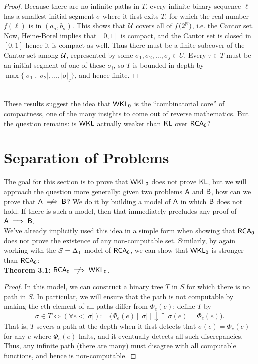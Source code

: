 \documentclass{amsart}
\begin{document}
\begin{proof}
		Because there are no infinite paths in $T$, every infinite binary sequence $\ell$ has a smallest initial segment $\sigma$ where it first exits $T$, for which the real number $f(\ell)$ is in $(a_{\sigma},b_{\sigma})$. This shows that $\mathcal{U}$ covers all of $f(2^{\mathbb{N}})$, i.e. the Cantor set.\\
		
		Now, Heine-Borel implies that $[0,1]$ is compact, and the Cantor set is closed in $[0,1]$ hence it is compact as well. Thus there must be a finite subcover of the Cantor set among $\mathcal{U}$, represented by some $\sigma_1,\sigma_2,\dots,\sigma_j\in U$. Every $\tau\in T$ must be an initial segment of one of these $\sigma_i$, so $T$ is bounded in depth by $\max\{|\sigma_1|,|\sigma_2|,\dots,|\sigma|_j\}$, and hence finite.
	\end{proof}\\
	
	These results suggest the idea that $\operatorname{\sf{WKL_0}}$ is the ``combinatorial core'' of compactness, one of the many insights to come out of reverse mathematics. But the question remains: is $\sf{WKL}$ actually weaker than $\operatorname{\sf{KL}}$ over $\operatorname{\sf{RCA_0}}$? 
	
	\newpage
	
	
	
	
	\section{Separation of Problems}
	
	The goal for this section is to prove that $\operatorname{\sf{WKL_0}}$ does not prove $\operatorname{\sf{KL}}$, but we will approach the question more generally: given two problems $\sf{A}$ and $\sf{B}$, how can we prove that $\sf{A}\centernot\implies \sf{B}$? We do it by building a model of $\sf{A}$ in which $\sf{B}$ does not hold. If there is such a model, then that immediately precludes any proof of $\sf{A}\implies \sf{B}$.\\
	
	We've already implicitly used this idea in a simple form when showing that $\operatorname{\sf{RCA_0}}$ does not prove the existence of any non-computable set. Similarly, by again working with the $\mathcal{S}=\Delta_1$ model of $\operatorname{\sf{RCA_0}}$, we can show that $\operatorname{\sf{WKL_0}}$ is stronger than $\operatorname{\sf{RCA_0}}$:\\
	
	\noindent \textbf{Theorem 3.1:} $\RCA\centernot\implies \WKL$.
	\begin{proof}
		In this model, we can construct a binary tree $T$ in $S$ for which there is no path in $S$. In particular, we will ensure that the path is not computable by making the $e$th element of all paths differ from $\Phi_e(e)$: define $T$ by 
		$$
		\sigma \in T \iff (\forall e < |\sigma|):\; \neg\big(\Phi_e(e)[|\sigma|]\downarrow \, \^ \;\, \sigma(e) = \Phi_e(e)\big).
		$$
		That is, $T$ severs a path at the depth when it first detects that $\sigma(e)=\Phi_e(e)$ for any $e$ where $\Phi_e(e)$ halts, and it eventually detects all such discrepancies. Thus, any infinite path (there are many) must disagree with all computable functions, and hence is non-computable.
	\end{proof}\\
	
\end{document}
